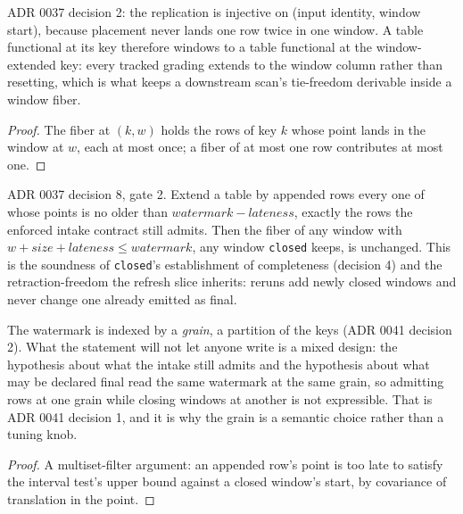 \begin{theorem}
  \label{thm:window-grading}\leanok
  ADR 0037 decision 2: the replication is injective on (input identity,
  window start), because placement never lands one row twice in one
  window.  A table functional at its key therefore windows to a table
  functional at the window-extended key: every tracked grading extends
  to the window column rather than resetting, which is what keeps a
  downstream scan's tie-freedom derivable inside a window fiber.
\end{theorem}
\begin{proof}\leanok
  The fiber at $(k, w)$ holds the rows of key $k$ whose point lands in
  the window at $w$, each at most once; a fiber of at most one row
  contributes at most one.
\end{proof}

\begin{theorem}
  \label{thm:closed-window-stable}\leanok
  ADR 0037 decision 8, gate 2.  Extend a table by appended rows every
  one of whose points is no older than
  $\mathit{watermark} - \mathit{lateness}$, exactly the rows the
  enforced intake contract still admits.  Then the fiber of any window
  with $w + \mathit{size} + \mathit{lateness} \le \mathit{watermark}$,
  any window \texttt{closed} keeps, is unchanged.  This is the soundness
  of \texttt{closed}'s establishment of completeness (decision 4) and
  the retraction-freedom the refresh slice inherits: reruns add newly
  closed windows and never change one already emitted as final.

  The watermark is indexed by a \emph{grain}, a partition of the keys
  (ADR 0041 decision 2).  What the statement will not let anyone write
  is a mixed design: the hypothesis about what the intake still admits
  and the hypothesis about what may be declared final read the same
  watermark at the same grain, so admitting rows at one grain while
  closing windows at another is not expressible.  That is ADR 0041
  decision 1, and it is why the grain is a semantic choice rather than a
  tuning knob.
\end{theorem}
\begin{proof}\leanok
  A multiset-filter argument: an appended row's point is too late to
  satisfy the interval test's upper bound against a closed window's
  start, by covariance of translation in the point.
\end{proof}


